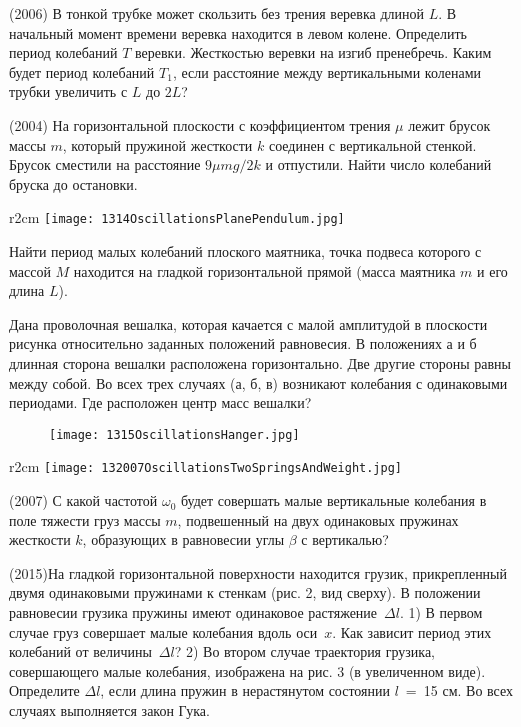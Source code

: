 \AddProb (2006) В тонкой трубке может скользить без трения веревка длиной $L$. В начальный момент времени веревка находится в левом колене. 
Определить период колебаний $T$ веревки. Жесткостью веревки на изгиб пренебречь. 
Каким будет период колебаний $T_1$, если расстояние между вертикальными коленами трубки увеличить с $L$ до $2L$?

\AddProb (2004) На горизонтальной плоскости с коэффициентом трения $\mu$ лежит брусок массы $m$, который пружиной жесткости $k$ соединен с вертикальной стенкой. Брусок сместили на расстояние $9\mu mg /2k$ и отпустили. Найти число колебаний бруска до остановки.

\begin{wrapfigure}{r}{2cm}
\texttt{[image: 1314OscillationsPlanePendulum.jpg]}
\end{wrapfigure}

\AddProb Найти период малых колебаний плоского маятника, точка подвеса которого с массой $M$ находится на гладкой горизонтальной прямой 
(масса маятника $m$ и его длина $L$).

\AddProb Дана проволочная вешалка, которая качается с малой амплитудой в плоскости рисунка относительно заданных положений равновесия. 
В положениях а и б длинная сторона вешалки расположена горизонтально. Две другие стороны равны между собой. 
Во всех трех случаях (а, б, в) возникают колебания с одинаковыми периодами. Где расположен центр масс вешалки?

\begin{figure}[!h]
\texttt{[image: 1315OscillationsHanger.jpg]}
\end{figure}


\begin{wrapfigure}{r}{2cm}
\texttt{[image: 132007OscillationsTwoSpringsAndWeight.jpg]}
\end{wrapfigure}

\AddProb (2007) С какой частотой $\omega_0$ будет совершать малые вертикальные колебания в поле тяжести груз массы $m$, 
подвешенный на двух одинаковых пружинах жесткости $k$, образующих в равновесии углы $\beta$ с вертикалью?

\AddProb (2015)На гладкой горизонтальной поверхности находится грузик, прикрепленный двумя одинаковыми пружинами к стенкам (рис. 2, вид сверху). 
В положении равновесии грузика пружины имеют одинаковое растяжение~$\Delta l$. 1) В первом случае груз совершает малые колебания вдоль оси~$x$. 
Как зависит период этих колебаний от величины~$\Delta l$?   2) Во втором случае траектория грузика, совершающего малые колебания, изображена на рис. 3 
(в увеличенном виде). Определите $\Delta l$, если длина пружин в нерастянутом состоянии $l$~=~15 см. Во всех случаях выполняется закон Гука.

